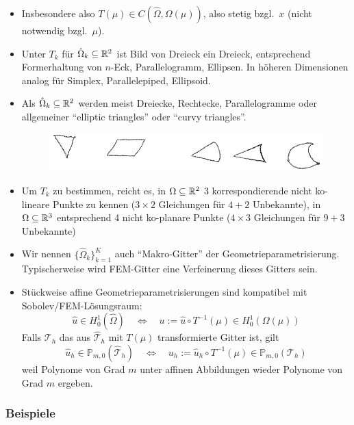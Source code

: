 \begin{bem} \beginwithlistbem
	\begin{itemize}
		\item Insbesondere also $T(\mu) \in C(\hat\Omega,\Omega(\mu))$, also stetig bzgl.\ $x$ (nicht notwendig bzgl.\ $\mu$).
		\item Unter $T_k$ für $\hat\Omega_k \subseteq \mathbb{R}^2$ ist Bild von Dreieck ein Dreieck, entsprechend Formerhaltung von $n$-Eck, Parallelogramm, Ellipsen.
			In höheren Dimensionen analog für Simplex, Parallelepiped, Ellipsoid.
		\item Als $\hat\Omega_k \subseteq \mathbb{R}^2$ werden meist Dreiecke, Rechtecke, Parallelogramme oder allgemeiner ``elliptic triangles'' oder ``curvy triangles''.
			\begin{figure}[H]
				\centering\small
				\includegraphics[width = 0.75 \textwidth]{Bilder/geom-formen.png}
			\end{figure}
		\item Um $T_k$ zu bestimmen, reicht es, in $\Omega \subseteq \mathbb{R}^2$ 3 korrespondierende nicht ko-lineare Punkte zu kennen ($3 \times 2$ Gleichungen für $4+2$ Unbekannte), in $\Omega \subseteq \mathbb{R}^3$ entsprechend 4 nicht ko-planare Punkte ($4 \times 3$ Gleichungen für $9+3$ Unbekannte)
		\item Wir nennen $\{\hat\Omega_k\}_{k=1}^K$ auch ``Makro-Gitter'' der Geometrieparametrisierung.
			Typischerweise wird FEM-Gitter eine Verfeinerung dieses Gitters sein.
		\item Stückweise affine Geometrieparametrisierungen sind kompatibel mit Sobolev/FEM-Lösungsraum:
			\[
				\hat u \in H_0^1(\hat\Omega) \quad \Leftrightarrow \quad u := \hat u \circ T^{-1}(\mu) \in H_0^1(\Omega(\mu))
			\]
			Falls $\mathcal{T}_h$ das aus $\hat{\mathcal{T}}_h$ mit $T(\mu)$ transformierte Gitter ist, gilt
			\[
				\hat u_h \in \mathbb{P}_{m,0}(\hat{\mathcal{T}}_h) \quad \Leftrightarrow \quad u_h := \hat u_h \circ T^{-1}(\mu) \in \mathbb{P}_{m,0}(\mathcal{T}_h)
			\]
			weil Polynome von Grad $m$ unter affinen Abbildungen wieder Polynome von Grad $m$ ergeben.
	\end{itemize}
\end{bem}

\subsubsection*{Beispiele}

